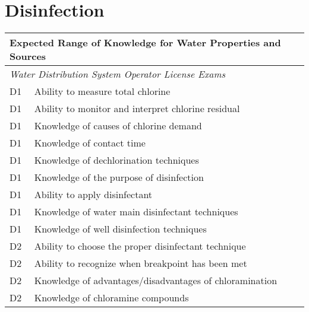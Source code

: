 
\chapter{Disinfection}
\nopagebreak
\begin{table}[H]
\begin{tabular}{| m{1cm} | m{15cm} |}
\hline
\multicolumn{2}{|l|}{\textbf{Expected   Range of Knowledge for Water Properties and Sources}}                                                                          \\ \hline
\multicolumn{2}{|l|}{\textit{Water   Distribution System Operator License Exams}}                                                                                      \\ \hline
D1 & Ability to   measure total chlorine                                                  \\ \hline
D1 & Ability to monitor   and interpret chlorine residual                                 \\ \hline
D1 & Knowledge of causes   of chlorine demand                                             \\ \hline
D1 & Knowledge of contact   time                                                          \\ \hline
D1 & Knowledge of   dechlorination techniques                                             \\ \hline
D1 & Knowledge of the   purpose of disinfection                                           \\ \hline
D1 & Ability to apply   disinfectant                                                      \\ \hline
D1 & Knowledge of water   main disinfectant techniques                                    \\ \hline
D1 & Knowledge of well   disinfection techniques                                          \\ \hline
D2 & Ability to choose the   proper disinfectant technique                                \\ \hline
D2 & Ability to recognize   when breakpoint has been met                                  \\ \hline
D2 & Knowledge of   advantages/disadvantages of chloramination                            \\ \hline
D2 & Knowledge of   chloramine compounds                                                  \\ \hline

\end{tabular}
\end{table}
